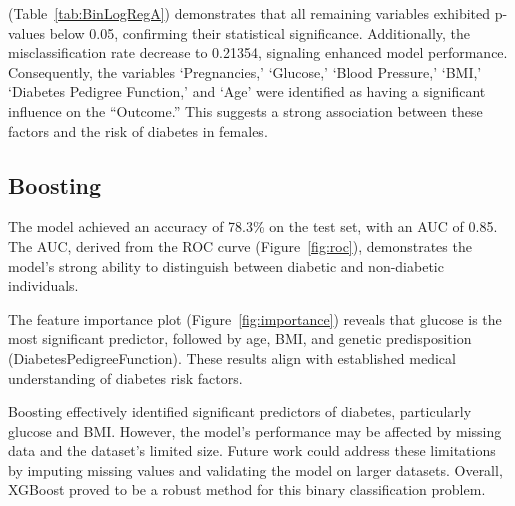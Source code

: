 \documentclass[12pt]{article}
\begin{document}
(Table~\ref{tab:BinLogRegA}) demonstrates that all remaining variables exhibited p-values below 0.05, confirming their statistical significance. Additionally, the misclassification rate decrease to 0.21354, signaling enhanced model performance. Consequently, the variables ‘Pregnancies,’ ‘Glucose,’ ‘Blood Pressure,’ ‘BMI,’ ‘Diabetes Pedigree Function,’ and ‘Age’ were identified as having a significant influence on the “Outcome.” This suggests a strong association between these factors and the risk of diabetes in females.

\subsection{Boosting}

The model achieved an accuracy of 78.3\% on the test set, with an AUC of 0.85. The AUC, derived from the ROC curve (Figure~\ref{fig:roc}), demonstrates the model's strong ability to distinguish between diabetic and non-diabetic individuals.

The feature importance plot (Figure~\ref{fig:importance}) reveals that glucose is the most significant predictor, followed by age, BMI, and genetic predisposition (DiabetesPedigreeFunction). These results align with established medical understanding of diabetes risk factors.



Boosting effectively identified significant predictors of diabetes, particularly glucose and BMI. However, the model's performance may be affected by missing data and the dataset's limited size. Future work could address these limitations by imputing missing values and validating the model on larger datasets. Overall, XGBoost proved to be a robust method for this binary classification problem.
\end{document}
